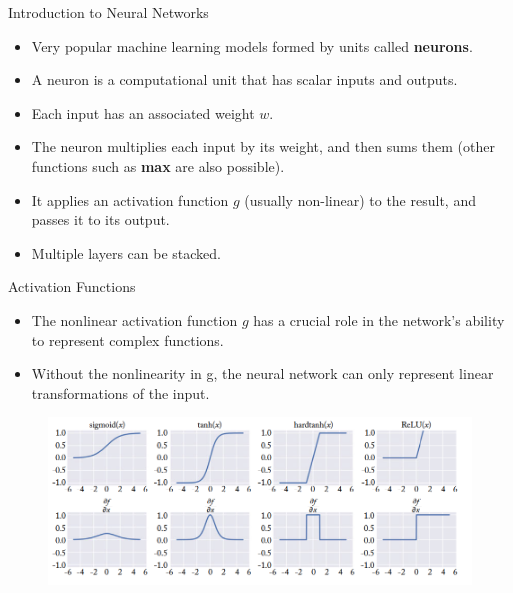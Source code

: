 \documentclass[handout]{beamer}
\begin{document}
\begin{frame}{Introduction to Neural Networks}
\begin{scriptsize}
\begin{itemize}
\item Very popular machine learning models formed by units called \textbf{neurons}.
\item A neuron is a computational unit that has scalar inputs and outputs. 
\item  Each input has an associated weight $w$.
 \item The neuron multiplies each input by its weight, and then sums them (other functions such as \textbf{max} are also possible). 
\item It applies an activation function $g$ (usually non-linear) to the result, and passes it to its output.
\item Multiple layers can be stacked.
\end{itemize}


\end{scriptsize}
\end{frame}


\begin{frame}{Activation Functions}

\begin{scriptsize}
\begin{itemize}
\item The nonlinear activation function $g$ has a crucial role in the network's ability to represent complex functions. 
\item Without the nonlinearity in g, the neural network can only represent linear transformations of the input.
\end{itemize}


\end{scriptsize}

\begin{figure}[htb]
	\centering
	 \includegraphics[scale=0.24]{pics/activations.png}
\end{figure}


\end{frame}
\end{document}

